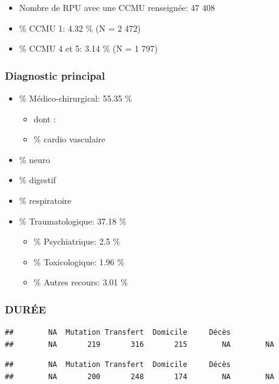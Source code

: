 \documentclass[]{article}
\begin{document}
\begin{itemize}
\itemsep1pt\parskip0pt
\item
  Nombre de RPU avec une CCMU renseignée: 47 408
\item
  \% CCMU 1: 4.32 \% (N = 2 472)
\item
  \% CCMU 4 et 5: 3.14 \% (N = 1 797)
\end{itemize}

\subsubsection{Diagnostic principal}\label{diagnostic-principal}

\begin{itemize}
\itemsep1pt\parskip0pt
\item
  \% Médico-chirurgical: 55.35 \%

  \begin{itemize}
  \itemsep1pt\parskip0pt
  \item
    dont :
  \item
    \% cardio vasculaire
  \end{itemize}
\item
  \% neuro
\item
  \% digestif
\item
  \% respiratoire
\item
  \% Traumatologique: 37.18 \%

  \begin{itemize}
  \itemsep1pt\parskip0pt
  \item
    \% Psychiatrique: 2.5 \%
  \item
    \% Toxicologique: 1.96 \%
  \item
    \% Autres recours: 3.01 \%
  \end{itemize}
\end{itemize}

\subsubsection{DURÉE}\label{duree}

\begin{verbatim}
##        NA  Mutation Transfert  Domicile     Décès           
##        NA       219       316       215        NA        NA
\end{verbatim}

\begin{verbatim}
##        NA  Mutation Transfert  Domicile     Décès           
##        NA       200       248       174        NA        NA
\end{verbatim}
\end{document}
